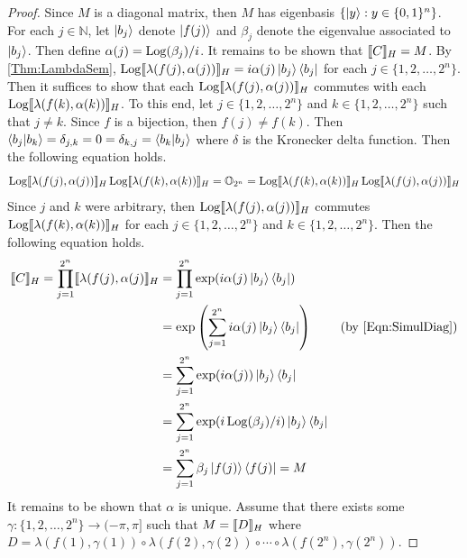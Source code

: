 \begin{proof}
    Since $M$ is a diagonal matrix, then $M$ has eigenbasis $\{ \ket{y} : y \in \{ 0, 1 \}^n \}$.
    For each $j \in \mathbb{N}$, let $\ket{b_j}$ denote $\ket{f( j )}$ and $\beta_j$ denote the eigenvalue associated to $\ket{b_j}$.
    Then define $\alpha( j ) = \operatorname{Log}( \beta_j ) / i$.
    It remains to be shown that $\llbracket C\rrbracket_H = M$.
    By \cref{Thm:LambdaSem}, $\operatorname{Log}\llbracket\lambda( f( j ), \alpha( j ) )\rrbracket_H = i \alpha( j ) \ket{b_j} \bra{b_j}$ for each $j \in \{ 1, 2, \ldots, 2^n \}$.
    Then it suffices to show that each $\operatorname{Log}\llbracket\lambda( f(j), \alpha(j) )\rrbracket_H$ commutes with each $\operatorname{Log}\llbracket\lambda( f(k), \alpha(k) )\rrbracket_H$.
    To this end, let $j \in \{ 1, 2, \ldots, 2^n \}$ and $k \in \{ 1, 2, \ldots, 2^n \}$ such that $j \ne k$.
    Since $f$ is a bijection, then $f(j) \ne f(k)$.
    Then $\braket{b_j|b_k} = \delta_{j,k} = 0 = \delta_{k,j} = \braket{b_k|b_j}$ where $\delta$ is the Kronecker delta function.
    Then the following equation holds.
    \begin{equation*}
        \operatorname{Log}\llbracket\lambda( f( j ), \alpha( j ) )\rrbracket_H\operatorname{Log}\llbracket\lambda( f( k ), \alpha( k ) )\rrbracket_H
        =
        \mathbb{O}_{2^n}
        =
        \operatorname{Log}\llbracket\lambda( f( k ), \alpha( k ) )\rrbracket_H\operatorname{Log}\llbracket\lambda( f( j ), \alpha( j ) )\rrbracket_H
    \end{equation*}
    Since $j$ and $k$ were arbitrary, then $\operatorname{Log}\llbracket\lambda( f(j), \alpha(j) )\rrbracket_H$ commutes $\operatorname{Log}\llbracket\lambda( f(k), \alpha(k) )\rrbracket_H$ for each $j \in \{ 1, 2, \ldots, 2^n \}$ and $k \in \{ 1, 2, \ldots, 2^n \}$.
    Then the following equation holds.
    \begin{align*}
        \sem{C}_H
        =
        \prod_{j=1}^{2^n} \sem{\lambda( f( j ), \alpha( j )}_H
        &=
        \prod_{j=1}^{2^n} \exp( i \alpha(j) \ket{b_j} \bra{b_j} )
        \\
        &=
        \exp\left( \sum_{j=1}^{2^n} i \alpha(j) \ket{b_j} \bra{b_j} \right)
        &
        ( \text{by~\cref{Eqn:SimulDiag}} )
        \\
        &=
        \sum_{j=1}^{2^n} \exp( i \alpha(j) ) \ket{b_j} \bra{b_j}
        \\
        &=
        \sum_{j=1}^{2^n} \exp( i \Log( \beta_j ) / i ) \ket{b_j} \bra{b_j}
        \\
        &=
        \sum_{j=1}^{2^n} \beta_j \ket{f(j)} \bra{f(j)}
        =
        M
    \end{align*}
    It remains to be shown that $\alpha$ is unique.
    Assume that there exists some $\gamma: \{ 1, 2, \ldots, 2^n \} \to (-\pi, \pi]$ such that $M = \llbracket D\rrbracket_H$ where $D = \lambda( f( 1 ), \gamma( 1 ) ) \circ \lambda( f( 2 ), \gamma( 2 ) ) \circ \cdots \circ \lambda( f( 2^n ), \gamma( 2^n ) )$.

\end{proof}
